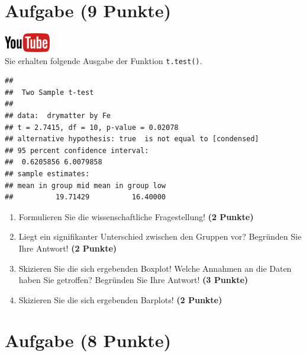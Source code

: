 \documentclass[a4paper, 9pt]{scrartcl}\usepackage[]{graphicx}\usepackage[]{xcolor}
\makeatletter
\newenvironment{kframe}{%
 \def\at@end@of@kframe{}%
 \ifinner\ifhmode%
  \def\at@end@of@kframe{\end{minipage}}%
  \begin{minipage}{\columnwidth}%
 \fi\fi%
 \def\FrameCommand##1{\hskip\@totalleftmargin \hskip-\fboxsep
 \colorbox{shadecolor}{##1}\hskip-\fboxsep
     \hskip-\linewidth \hskip-\@totalleftmargin \hskip\columnwidth}%
 \MakeFramed {\advance\hsize-\width
   \@totalleftmargin\z@ \linewidth\hsize
   \@setminipage}}%
 {\par\unskip\endMakeFramed%
 \at@end@of@kframe}
\newenvironment{knitrout}{}{} %
\makeatother
\begin{document}
\section{Aufgabe \hfill (9 Punkte)}

\hfill\href{https://youtu.be/w62HJlbN28U}{\includegraphics[width =
  2cm]{img/youtube}}\\[1Ex]

Sie erhalten folgende \Rlogo Ausgabe der Funktion \texttt{t.test()}.

\begin{knitrout}
\color{fgcolor}\begin{kframe}
\begin{verbatim}
## 
## 	Two Sample t-test
## 
## data:  drymatter by Fe
## t = 2.7415, df = 10, p-value = 0.02078
## alternative hypothesis: true  is not equal to [condensed]
## 95 percent confidence interval:
##  0.6205856 6.0079858
## sample estimates:
## mean in group mid mean in group low 
##          19.71429          16.40000
\end{verbatim}
\end{kframe}
\end{knitrout}


\begin{enumerate}
  \item Formulieren Sie die wissenschaftliche Fragestellung! \textbf{(2
Punkte)}
\item Liegt ein signifikanter Unterschied zwischen den Gruppen vor?
  Begr{\"u}nden Sie Ihre Antwort! \textbf{(2 Punkte)}
\item Skizieren Sie die sich ergebenden Boxplot!
  Welche Annahmen an die Daten haben Sie getroffen? Begr{\"u}nden Sie Ihre
  Antwort! \textbf{(3 Punkte)} 
\item Skizieren Sie die sich ergebenden Barplots! \textbf{(2 Punkte)} 
\end{enumerate}
 
\clearpage

\section{Aufgabe \hfill (8 Punkte)}
\end{document}
